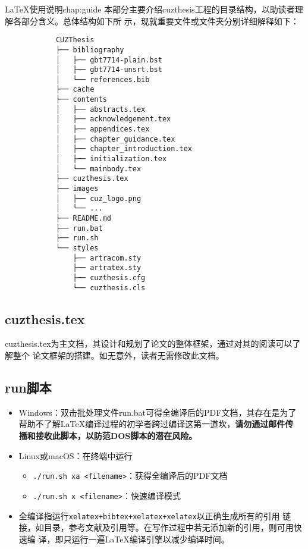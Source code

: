 \begin{cuzchapter}{\LaTeX{}使用说明}{chap:guide}
本部分主要介绍cuzthesis工程的目录结构，以助读者理解各部分含义。总体结构如下所
示，现就重要文件或文件夹分别详细解释如下：

\begingroup
    \small\linespread{1}
    \begin{center}
        \begin{verbatim}
            CUZThesis
            ├── bibliography
            │   ├── gbt7714-plain.bst
            │   ├── gbt7714-unsrt.bst
            │   └── references.bib
            ├── cache
            ├── contents
            │   ├── abstracts.tex
            │   ├── acknowledgement.tex
            │   ├── appendices.tex
            │   ├── chapter_guidance.tex
            │   ├── chapter_introduction.tex
            │   ├── initialization.tex
            │   └── mainbody.tex
            ├── cuzthesis.tex
            ├── images
            │   ├── cuz_logo.png
            │   └── ...
            ├── README.md
            ├── run.bat
            ├── run.sh
            └── styles
                ├── artracom.sty
                ├── artratex.sty
                ├── cuzthesis.cfg
                └── cuzthesis.cls
        \end{verbatim}
    \end{center}
\endgroup

\subsection{cuzthesis.tex}\label{sub:cuzthesis}

cuzthesis.tex为主文档，其设计和规划了论文的整体框架，通过对其的阅读可以了解整个
论文框架的搭建。如无意外，读者无需修改此文档。

\subsection{run脚本}\label{sub:scripts}

\begin{itemize}
    \item Windows：双击批处理文件run.bat可得全编译后的PDF文档，其存在是为了
    帮助不了解\LaTeX{}编译过程的初学者跨过编译这第一道坎，\textbf{请勿通过邮件传
    播和接收此脚本，以防范DOS脚本的潜在风险。}
    \item Linux或macOS：在终端中运行
        \begin{itemize}
            \item \verb|./run.sh xa <filename>|：获得全编译后的PDF文档
            \item \verb|./run.sh x <filename>|：快速编译模式
        \end{itemize}
    \item 全编译指运行\verb|xelatex+bibtex+xelatex+xelatex|以正确生成所有的引用
    链接，如目录，参考文献及引用等。在写作过程中若无添加新的引用，则可用快速编
    译，即只运行一遍\LaTeX{}编译引擎以减少编译时间。
\end{itemize}


\end{cuzchapter}
